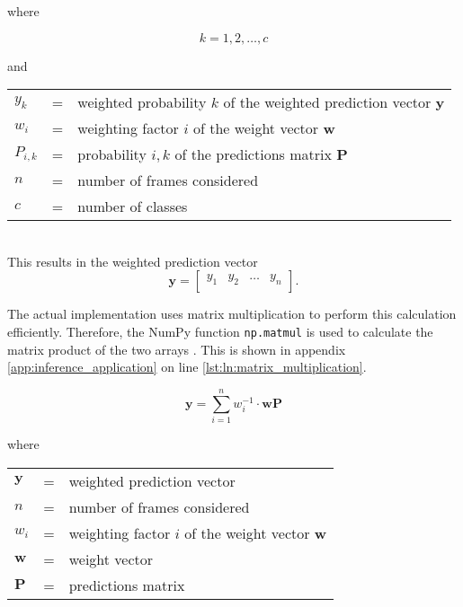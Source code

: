 where

\[
  k = 1, 2, \dots, c
\]

and

\begin{tabular}{lll}
  $y_k$ & = & weighted probability $k$ of the weighted prediction vector $\boldsymbol{y}$ \\ %
  $w_i$ & = & weighting factor $i$ of the weight vector $\boldsymbol{w}$ \\
  $P_{i,k}$ & = & probability $i,k$ of the predictions matrix $\boldsymbol{P}$ \\
  $n$ & = & number of frames considered \\
  $c$ & = & number of classes \\
\end{tabular}
\\

This results in the weighted prediction vector
\begin{equation}
  \boldsymbol{y} =
  \begin{bmatrix}
    y_{1} & y_{2} & \dots & y_{n} \\
  \end{bmatrix}.
  \label{eq:weighted_prediction_vector}
\end{equation}

The actual implementation uses matrix multiplication to perform this calculation efficiently.
Therefore, the NumPy function \texttt{np.matmul} is used to calculate the matrix product of the two arrays \cite{}. %
This is shown in appendix \ref{app:inference_application} on line \ref{lst:ln:matrix_multiplication}.

\begin{equation}
  \boldsymbol{y} = \sum\limits_{i=1}^{n} w_i^{-1} \cdot \boldsymbol{w} \boldsymbol{P}
  \label{eq:weighted_prediction}
\end{equation}

where

\begin{tabular}{lll}
  $\boldsymbol{y}$ & = & weighted prediction vector \\ %
  $n$ & = & number of frames considered \\
  $w_i$ & = & weighting factor $i$ of the weight vector $\boldsymbol{w}$ \\
  $\boldsymbol{w}$ & = & weight vector \\ %
  $\boldsymbol{P}$ & = & predictions matrix \\ %
\end{tabular}
\\


